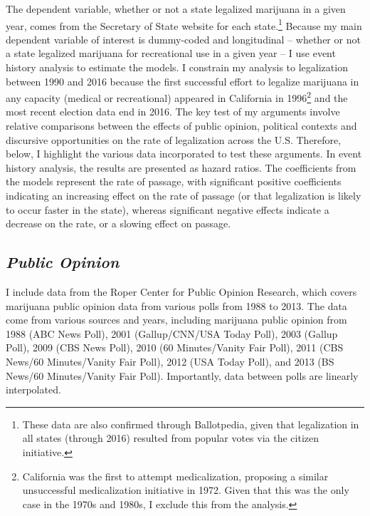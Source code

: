 The dependent variable, whether or not a state legalized marijuana in a given year, comes from the Secretary of State website for each state.\footnote{These data are also confirmed through Ballotpedia, given that legalization in all states (through 2016) resulted from popular votes via the citizen initiative.} Because my main dependent variable of interest is dummy-coded and longitudinal -- whether or not a state legalized marijuana for recreational use in a given year -- I use event history analysis to estimate the models. I constrain my analysis to legalization between 1990 and 2016 because the first successful effort to legalize marijuana in any capacity (medical or recreational) appeared in California in 1996\footnote{California was the first to attempt medicalization, proposing a similar unsuccessful medicalization initiative in 1972. Given that this was the only case in the 1970s and 1980s, I exclude this from the analysis.} and the most recent election data end in 2016. The key test of my arguments involve relative comparisons between the effects of public opinion, political contexts and discursive opportunities on the rate of legalization across the U.S. Therefore, below, I highlight the various data incorporated to test these arguments. In event history analysis, the results are presented as hazard ratios. The coefficients from the models represent the rate of passage, with significant positive coefficients indicating an increasing effect on the rate of passage (or that legalization is likely to occur faster in the state), whereas significant negative effects indicate a decrease on the rate, or a slowing effect on passage. 

\subsection{\it{Public Opinion}}

I include data from the Roper Center for Public Opinion Research, which covers marijuana public opinion data from various polls from 1988 to 2013. The data come from various sources and years, including marijuana public opinion from 1988 (ABC News Poll), 2001 (Gallup/CNN/USA Today Poll), 2003 (Gallup Poll), 2009 (CBS News Poll), 2010 (60 Minutes/Vanity Fair Poll), 2011 (CBS News/60 Minutes/Vanity Fair Poll), 2012 (USA Today Poll), and 2013 (BS News/60 Minutes/Vanity Fair Poll). Importantly, data between polls are linearly interpolated. 




